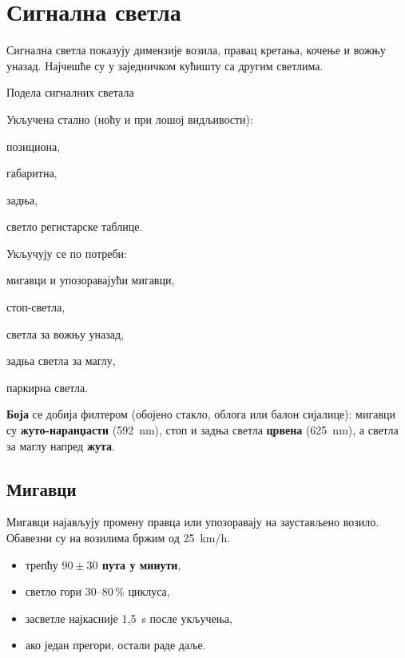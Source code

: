 \documentclass{report}
\begin{document}
\chapter{Сигнална светла}

Сигнална светла показују димензије возила, правац кретања, кочење и вожњу
уназад. Најчешће су у заједничком кућишту са другим светлима.

\begin{podela}{Подела сигналних светала}
\begin{lista}
    \item Укључена стално (ноћу и при лошој видљивости):
    \begin{lista}
        \item позициона,
        \item габаритна,
        \item задња,
        \item светло регистарске таблице.
    \end{lista}
    \item Укључују се по потреби:
    \begin{lista}
        \item мигавци и упозоравајући мигавци,
        \item стоп-светла,
        \item светла за вожњу уназад,
        \item задња светла за маглу,
        \item паркирна светла.
    \end{lista}
\end{lista}
\end{podela}

\textbf{Боја} се добија филтером (обојено стакло, облога или балон сијалице):
мигавци су \textbf{жуто-наранџасти} (592~nm), стоп и задња светла
\textbf{црвена} (625~nm), а светла за маглу напред \textbf{жута}.

\section{Мигавци}

Мигавци најављују промену правца или упозоравају на заустављено возило.
Обавезни су на возилима бржим од 25~km/h.

\begin{kljucno}
\begin{itemize}[noitemsep]
    \item трепћу \textbf{$90 \pm 30$ пута у минути},
    \item светло гори 30--80\,\% циклуса,
    \item засветле најкасније 1,5~s после укључења,
    \item ако један прегори, остали раде даље.
\end{itemize}
\end{kljucno}
\end{document}
